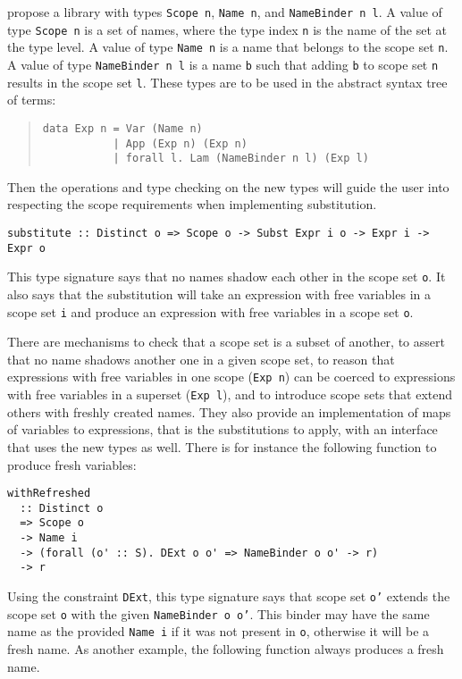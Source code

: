 \documentclass[sigconf]{acmart}
\newcommand{\tc}[1]{{\small\texttt{#1}}}
\begin{document}
 propose a library with types \tc{Scope n}, \tc{Name n}, and
\tc{Name\-Binder n l}. A value of type \tc{Scope n} is a set of names, where
the type index \tc{n} is the name of the set at the type level. A value of type \tc{Name n} is a name that
belongs to the scope set \tc{n}. A value of type \tc{NameBinder n l} is
a name \tc{b} such that adding \tc{b} to scope set \tc{n} results in the scope
set \tc{l}.
These types are to be used in
the abstract syntax tree of terms:

\begin{quotation}
\begin{verbatim}
data Exp n = Var (Name n)
           | App (Exp n) (Exp n)
           | forall l. Lam (NameBinder n l) (Exp l)
\end{verbatim}
\end{quotation}

Then the operations and type checking on the new types will guide the user into
respecting the scope requirements when implementing substitution.

\begin{verbatim}
substitute :: Distinct o => Scope o -> Subst Expr i o -> Expr i -> Expr o
\end{verbatim}

This type signature says that no names shadow each other in the scope set \tc{o}.
It also says that the substitution will take an expression with free variables in
a scope set \tc{i} and produce an expression with free variables in a scope set
\tc{o}.

There
are mechanisms to check that a scope set is a subset of another, to assert that no
name shadows another one in a given scope set, to reason that expressions
with free variables in one scope (\tc{Exp n}) can be coerced to expressions with
free variables in a superset (\tc{Exp l}), and to introduce scope sets that extend
others with freshly created names. They also provide an implementation of maps of
variables to expressions, that is the substitutions to apply, with an interface
that uses the new types as well. There is for instance the following function to
produce fresh variables:

\begin{verbatim}
withRefreshed
  :: Distinct o
  => Scope o
  -> Name i
  -> (forall (o' :: S). DExt o o' => NameBinder o o' -> r)
  -> r
\end{verbatim}

Using the constraint \tc{DExt}, this type signature says that scope set \tc{o'}
extends the scope set \tc{o} with the given \tc{NameBinder o o'}. This binder
may have the same name as the provided \tc{Name i} if it was not present in
\tc{o}, otherwise it will be a fresh name. As another example, the following
function always produces a fresh name.
\end{document}
